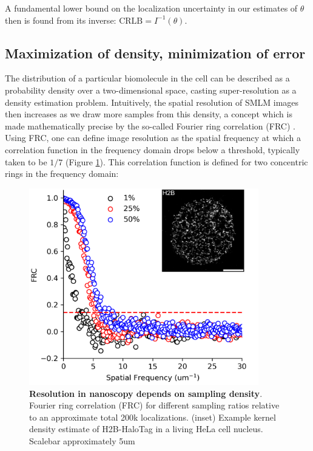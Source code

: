 A fundamental lower bound on the localization uncertainty in our estimates of $\theta$ then is found from its inverse: $\mathrm{CRLB} = I^{-1}(\theta)$.

\subsection{Maximization of density, minimization of error}

The distribution of a particular biomolecule in the cell can be described as a probability density over a two-dimensional space, casting super-resolution as a density estimation problem. Intuitively, the spatial resolution of SMLM images then increases as we draw more samples from this density, a concept which is made mathematically precise by the so-called Fourier ring correlation (FRC) \parencite{Nieuwenhuizen2013}. Using FRC, one can define image resolution as the spatial frequency at which a correlation function in the frequency domain drops below a threshold, typically taken to be $1/7$  (Figure \ref{fig:fig3}). This correlation function is defined for two concentric rings in the frequency domain:

\begin{figure}[t]
\begin{center}
\includegraphics[width=10cm]{media/FRC.png}
\end{center}
\caption{\textbf{Resolution in nanoscopy depends on sampling density}. Fourier ring correlation (FRC) for different sampling ratios relative to an approximate total 200k localizations. (inset) Example kernel density estimate of H2B-HaloTag in a living HeLa cell nucleus. Scalebar approximately 5um}
\label{fig:fig3}
\end{figure}

